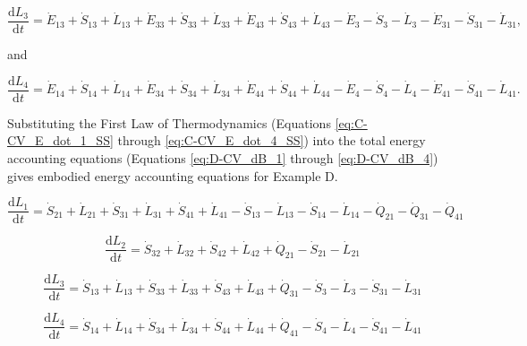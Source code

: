 \documentclass[authoryear,preprint,review,12pt]{elsarticle}
\begin{document}
\begin{equation} \label{eq:D-CV_dB_3}
	\frac{\mathrm{d}L_{3}}{\mathrm{d}t} 	 = \dot{E}_{13} + \dot{S}_{13} + \dot{L}_{13} + \dot{E}_{33} + \dot{S}_{33} + \dot{L}_{33}+ \dot{E}_{43} + \dot{S}_{43} + \dot{L}_{43} - \dot{E}_{3} - \dot{S}_{3} - \dot{L}_{3} - \dot{E}_{31} - \dot{S}_{31} - \dot{L}_{31},
\end{equation}

\noindent and 

\begin{equation} \label{eq:D-CV_dB_4}
	\frac{\mathrm{d}L_{4}}{\mathrm{d}t} 	 = \dot{E}_{14} + \dot{S}_{14} + \dot{L}_{14} + \dot{E}_{34} + \dot{S}_{34} + \dot{L}_{34}+ \dot{E}_{44} + \dot{S}_{44} + \dot{L}_{44} - \dot{E}_{4} - \dot{S}_{4} - \dot{L}_{4} - \dot{E}_{41} - \dot{S}_{41} - \dot{L}_{41}.
\end{equation}

Substituting the First Law of Thermodynamics (Equations \ref{eq:C-CV_E_dot_1_SS} through \ref{eq:C-CV_E_dot_4_SS}) into the total energy accounting equations (Equations \ref{eq:D-CV_dB_1} through \ref{eq:D-CV_dB_4}) gives embodied energy accounting equations for Example D.

\begin{equation} \label{eq:D-embodied_acct_1}
	\frac{\mathrm{d}L_{1}}{\mathrm{d}t} 	 = \dot{S}_{21} + \dot{L}_{21} + \dot{S}_{31} + \dot{L}_{31} + \dot{S}_{41} + \dot{L}_{41} - \dot{S}_{13} - \dot{L}_{13} - \dot{S}_{14} -  \dot{L}_{14} - \dot{Q}_{21} - \dot{Q}_{31} - \dot{Q}_{41}
\end{equation}

\begin{equation} \label{eq:D-embodied_acct_2}
	\frac{\mathrm{d}L_{2}}{\mathrm{d}t} 	 = \dot{S}_{32} +  \dot{L}_{32} + \dot{S}_{42} +  \dot{L}_{42} + \dot{Q}_{21} - \dot{S}_{21} -  \dot{L}_{21}
\end{equation}

\begin{equation} \label{eq:D-embodied_acct_3}
	\frac{\mathrm{d}L_{3}}{\mathrm{d}t} 	 = \dot{S}_{13} +  \dot{L}_{13} + \dot{S}_{33} +  \dot{L}_{33} + \dot{S}_{43} +  \dot{L}_{43} + \dot{Q}_{31} - \dot{S}_{3} -  \dot{L}_{3} - \dot{S}_{31} -  \dot{L}_{31}
\end{equation}

\begin{equation} \label{eq:D-embodied_acct_4}
	\frac{\mathrm{d}L_{4}}{\mathrm{d}t}	 = \dot{S}_{14} +  \dot{L}_{14} + \dot{S}_{34} +  \dot{L}_{34} + \dot{S}_{44} +  \dot{L}_{44} + \dot{Q}_{41} - \dot{S}_{4} -  \dot{L}_{4} - \dot{S}_{41} -  \dot{L}_{41}
\end{equation}
\end{document}
